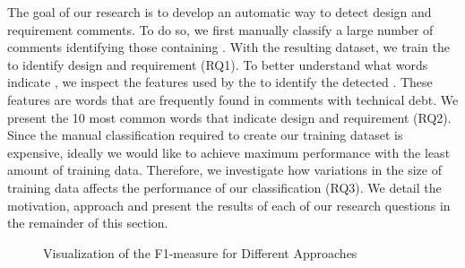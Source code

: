 The goal of our research is to develop an automatic way to detect design and requirement \SATD comments. To do so, we first manually classify a large number of comments identifying those containing \SATD. With the resulting dataset, we train the  to identify design and requirement \SATD (RQ1). To better understand what words indicate \SATD, we inspect the features used by the  to identify the detected \SATD. These features are words that are frequently found in comments with technical debt. We present the 10 most common words that indicate design and requirement \SATD (RQ2). Since the manual classification required to create our training dataset is expensive, ideally we would like to achieve maximum performance with the least amount of training data. Therefore, we investigate how variations in the size of training data affects the performance of our classification (RQ3). We detail the motivation, approach and present the results of each of our research questions in the remainder of this section. 

\begin{figure}[!thb]
  \centering
  \vspace{-3mm}
  \caption{Visualization of the F1-measure for Different Approaches}
\end{figure}

